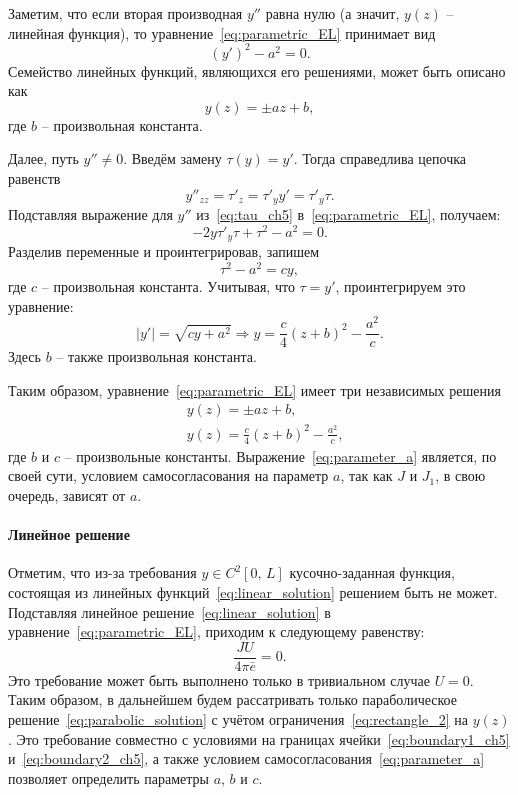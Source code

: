 Заметим, что если вторая производная  $y''$ равна нулю (а значит, $y(z)$ -- линейная функция), то уравнение~\eqref{eq:parametric_EL} принимает вид
\begin{equation}
(y')^2 - a^2 = 0.
\end{equation}
Семейство линейных функций, являющихся его решениями, может быть описано как
\begin{equation}
y(z) = \pm az + b,
\end{equation}
где $b$ -- произвольная константа.

Далее, путь $y'' \neq 0$.
Введём замену $\tau(y) = y'$.
Тогда справедлива цепочка равенств
\begin{equation}\label{eq:tau_ch5}
y''_{zz} = \tau'_z = \tau'_y y' = \tau'_y\tau.
\end{equation}
Подставляя выражение для $y''$ из~\eqref{eq:tau_ch5} в~\eqref{eq:parametric_EL}, получаем:
\begin{equation}
-2y\tau'_y\tau + \tau^2 - a^2 = 0.
\end{equation}
Разделив переменные и проинтегрировав, запишем
\begin{equation}
\tau^2 - a^2 = cy,
\end{equation}
где $c$ -- произвольная константа.
Учитывая, что $\tau = y'$, проинтегрируем это уравнение:
\begin{equation}
|y'| = \sqrt{cy + a^2} \Rightarrow y = \frac{c}{4}\left( z + b \right)^2- \frac{a^2}{c}.
\end{equation}
Здесь $b$ -- также произвольная константа.

Таким образом, уравнение~\eqref{eq:parametric_EL} имеет три независимых решения
\begin{align}
&y(z) = \pm az + b,\label{eq:linear_solution}\\
&y(z) = \frac{c}{4}\left(z+b\right)^2 - \frac{a^2}{c},\label{eq:parabolic_solution}
\end{align}
где $b$ и $c$ -- произвольные константы.
Выражение~\eqref{eq:parameter_a} является, по своей сути, условием самосогласования на параметр $a$, так как $J$ и $J_1$, в свою очередь, зависят от $a$.
\paragraph{Линейное решение}
Отметим, что из-за требования $y\in C^2[0,\, L]$ кусочно-заданная функция, состоящая из линейных функций~\eqref{eq:linear_solution} решением быть не может.
Подставляя линейное решение~\eqref{eq:linear_solution} в уравнение~\eqref{eq:parametric_EL}, приходим к следующему равенству:
\begin{equation*}
\frac{JU}{4\pi\bar{e}} = 0.
\end{equation*}
Это требование может быть выполнено только в тривиальном случае $U = 0$.
Таким образом, в дальнейшем будем рассатривать только параболическое решение~\eqref{eq:parabolic_solution} с учётом ограничения~\eqref{eq:rectangle_2} на $y(z)$.
Это требование совместно с условиями на границах ячейки~\eqref{eq:boundary1_ch5} и~\eqref{eq:boundary2_ch5}, а также условием самосогласования~\eqref{eq:parameter_a} позволяет определить параметры $a$, $b$ и $c$.
